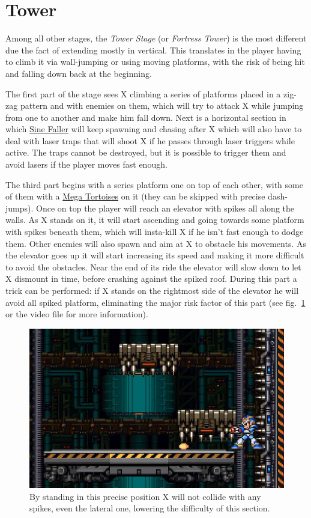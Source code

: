 \section{Tower}
Among all other stages, the \textit{Tower Stage} (or \textit{Fortress Tower}) is the most different due the fact of extending mostly in vertical. This translates in the player having to climb it via wall-jumping or using moving platforms, with the risk of being hit and falling down back at the beginning.

The first part of the stage sees X climbing a series of platforms placed in a zig-zag pattern and with enemies on them, which will try to attack X while jumping from one to another and make him fall down. Next is a horizontal section in which \hyperlink{enem:Sine_Faller}{Sine Faller} will keep spawning and chasing after X which will also have to deal with laser traps that will shoot X if he passes through laser triggers while active. The traps cannot be destroyed, but it is possible to trigger them and avoid lasers if the player moves fast enough. 

The third part begins with a series platform one on top of each other, with some of them with a \hyperlink{enem:Mega_Tortoise}{Mega Tortoises} on it (they can be skipped with precise dash-jumps). Once on top the player will reach an elevator with spikes all along the walls. As X stands on it, it will start ascending and going towards some platform with spikes beneath them, which will insta-kill X if he isn't fast enough to dodge them. Other enemies will also spawn and aim at X to obstacle his movements. As the elevator goes up it will start increasing its speed and making it more difficult to avoid the obstacles. Near the end of its ride the elevator will slow down to let X dismount in time, before crashing against the spiked roof. During this part a trick can be performed: if X stands on the rightmost side of the elevator he will avoid all spiked platform, eliminating the major risk factor of this part (see fig.~\ref{tower_spike} or the video file  for more information). 
\begin{figure}[htp]
	\centering
	\includegraphics[width=0.5\linewidth]{figures/X1/Boomer_kuwanger/Tower_spike_skip.jpg}
	\caption{By standing in this precise position X will not collide with any spikes, even the lateral one, lowering the difficulty of this section.}
	\label{tower_spike}
\end{figure}

